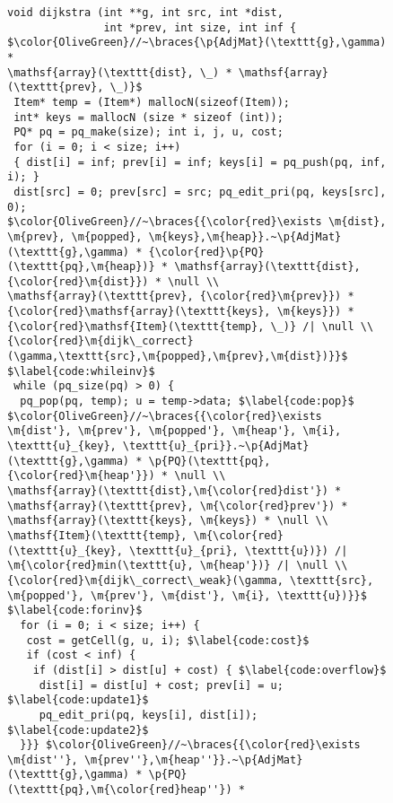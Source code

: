 
\begin{figure}[t]

\begin{lstlisting}[mathescape=true,showlines=true]
void dijkstra (int **g, int src, int *dist, 
               int *prev, int size, int inf {
$\color{OliveGreen}//~\braces{\p{AdjMat}(\texttt{g},\gamma) *
\mathsf{array}(\texttt{dist}, \_) * \mathsf{array}(\texttt{prev}, \_)}$
 Item* temp = (Item*) mallocN(sizeof(Item));
 int* keys = mallocN (size * sizeof (int));
 PQ* pq = pq_make(size); int i, j, u, cost;
 for (i = 0; i < size; i++) 
 { dist[i] = inf; prev[i] = inf; keys[i] = pq_push(pq, inf, i); }
 dist[src] = 0; prev[src] = src; pq_edit_pri(pq, keys[src], 0);
$\color{OliveGreen}//~\braces{{\color{red}\exists \m{dist}, \m{prev}, \m{popped}, \m{keys},\m{heap}}.~\p{AdjMat}(\texttt{g},\gamma) * {\color{red}\p{PQ}(\texttt{pq},\m{heap})} * \mathsf{array}(\texttt{dist},{\color{red}\m{dist}}) * \null \\
\mathsf{array}(\texttt{prev}, {\color{red}\m{prev}}) * 
{\color{red}\mathsf{array}(\texttt{keys}, \m{keys}}) * 
{\color{red}\mathsf{Item}(\texttt{temp}, \_)} /| \null \\
{\color{red}\m{dijk\_correct}(\gamma,\texttt{src},\m{popped},\m{prev},\m{dist})}}$ $\label{code:whileinv}$
 while (pq_size(pq) > 0) {
  pq_pop(pq, temp); u = temp->data; $\label{code:pop}$
$\color{OliveGreen}//~\braces{{\color{red}\exists \m{dist'}, \m{prev'}, \m{popped'}, \m{heap'}, \m{i}, \texttt{u}_{key}, \texttt{u}_{pri}}.~\p{AdjMat}(\texttt{g},\gamma) * \p{PQ}(\texttt{pq},{\color{red}\m{heap'}}) * \null \\
\mathsf{array}(\texttt{dist},\m{\color{red}dist'}) * 
\mathsf{array}(\texttt{prev}, \m{\color{red}prev'}) * 
\mathsf{array}(\texttt{keys}, \m{keys}) * \null \\
\mathsf{Item}(\texttt{temp}, \m{\color{red}(\texttt{u}_{key}, \texttt{u}_{pri}, \texttt{u})}) /| 
\m{\color{red}min(\texttt{u}, \m{heap'})} /| \null \\
{\color{red}\m{dijk\_correct\_weak}(\gamma, \texttt{src}, \m{popped'}, \m{prev'}, \m{dist'}, \m{i}, \texttt{u})}}$ $\label{code:forinv}$
  for (i = 0; i < size; i++) {
   cost = getCell(g, u, i); $\label{code:cost}$
   if (cost < inf) {
    if (dist[i] > dist[u] + cost) { $\label{code:overflow}$
     dist[i] = dist[u] + cost; prev[i] = u; $\label{code:update1}$ 
     pq_edit_pri(pq, keys[i], dist[i]); $\label{code:update2}$
  }}} $\color{OliveGreen}//~\braces{{\color{red}\exists \m{dist''}, \m{prev''},\m{heap''}}.~\p{AdjMat}(\texttt{g},\gamma) * \p{PQ}(\texttt{pq},\m{\color{red}heap''}) *

\end{lstlisting}
\end{figure}
